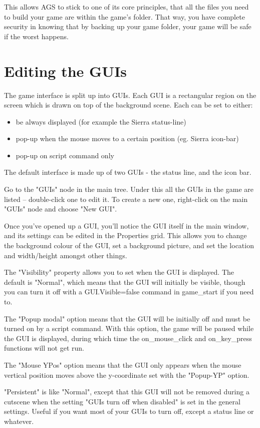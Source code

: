This allows AGS to stick to one of its core principles, that all the files you need
to build your game are within the game's folder. That way, you have complete security
in knowing that by backing up your game folder, your game will be safe if the worst happens.


\section{Editing the GUIs}%

The game interface is split up into GUIs. Each GUI is a
rectangular region on the screen which is drawn on top of the background
scene. Each can be set to either:
\begin{itemize}
\item be always displayed (for example the Sierra status-line)
\item pop-up when the mouse moves to a certain position (eg. Sierra icon-bar)
\item pop-up on script command only
\end{itemize}
The default interface is made up of two GUIs - the status line, and the
icon bar.

Go to the "GUIs" node in the main tree. Under this all the GUIs in the game
are listed -- double-click one to edit it. To create a new one, right-click
on the main "GUIs" node and choose "New GUI".

Once you've opened up a GUI, you'll notice the GUI itself in the main window,
and its settings can be edited in the Properties grid. This allows you to change the
background colour of the GUI, set a background picture, and set the
location and width/height amongst other things.

The "Visibility" property allows you to set when the GUI is displayed. The
default is "Normal", which means that the GUI will initially be visible,
though you can turn it off with a GUI.Visible=false command in game_start if you need to.

The "Popup modal" option means that the GUI will be initially
off and must be turned on by a script command. With this option,
the game will be paused while the GUI is displayed, during which time the
on_mouse_click  and  on_key_press  functions will not get run.

The "Mouse YPos" option means that the GUI only appears when the mouse vertical
position moves above the y-coordinate set with the "Popup-YP" option.

"Persistent" is like "Normal", except that this GUI will not be removed
during a cutscene when the setting "GUIs turn off when disabled" is set in
the general settings. Useful if you want most of your GUIs to turn off, except
a status line or whatever.

